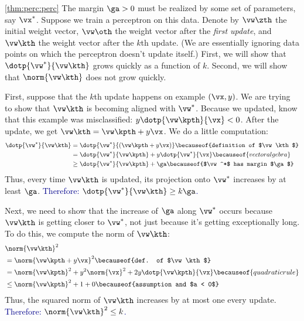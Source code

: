 \begin{myproof}{\ref{thm:perc:perc}}
  The margin $\ga > 0$ must be realized by some set of parameters, say
  $\vx^*$.  Suppose we train a perceptron on this data.  Denote by
  $\vw\zth$ the initial weight vector, $\vw\oth$ the weight vector
  after the \emph{first update}, and $\vw\kth$ the weight vector after
  the $k$th update.  (We are essentially ignoring data points on which
  the perceptron doesn't update itself.)  First, we will show that
  $\dotp{\vw^*}{\vw\kth}$ grows quickly as a function of $k$.  Second,
  we will show that $\norm{\vw\kth}$ does not grow quickly.

  First, suppose that the $k$th update happens on example $(\vx,y)$.
  We are trying to show that $\vw\kth$ is becoming aligned with
  $\vw^*$.  Because we updated, know that this example was
  misclassified: $y \dotp{\vw\kpth}{\vx} < 0$.  After the update, we get
  $\vw\kth = \vw\kpth + y \vx$.  We do a little computation:
  \begin{align}
    \dotp{\vw^*}{\vw\kth}
    &= \dotp{\vw^*}{\left(\vw\kpth + y \vx\right)}
         \becauseof{definition of $\vw\kth$}
    \\
    &= \dotp{\vw^*}{\vw\kpth} + y \dotp{\vw^*}{\vx}
         \becauseof{vector algebra}
    \\
    &\geq \dotp{\vw^*}{\vw\kpth} + \ga
         \becauseof{$\vw^*$ has margin $\ga$}
  \end{align}
  Thus, every time $\vw\kth$ is updated, its projection onto $\vw^*$
  increases by at least $\ga$.  \textcolor{darkblue}{Therefore:
    $\dotp{\vw^*}{\vw\kth} \geq k \ga$.}

  Next, we need to show that the increase of $\ga$ along $\vw^*$
  occurs because $\vw\kth$ is getting closer to $\vw^*$, not just
  because it's getting exceptionally long.  To do this, we compute the
  norm of $\vw\kth$:
  \begin{align}
    & \norm{\vw\kth}^2 \nonumber\\
    &= \norm{\vw\kpth + y \vx}^2
         \becauseof{def. of $\vw\kth$} \\
    &= \norm{\vw\kpth}^2 + y^2 \norm{\vx}^2 + 2 y \dotp{\vw\kpth}{\vx}
         \becauseof{quadratic rule} \\
    &\leq \norm{\vw\kpth}^2 + 1 + 0
         \becauseof{assumption and $a < 0$}
  \end{align}
  Thus, the squared norm of $\vw\kth$ increases by at most one every
  update.  \textcolor{darkblue}{Therefore: $\norm{\vw\kth}^2 \leq k$.}


\end{myproof}
